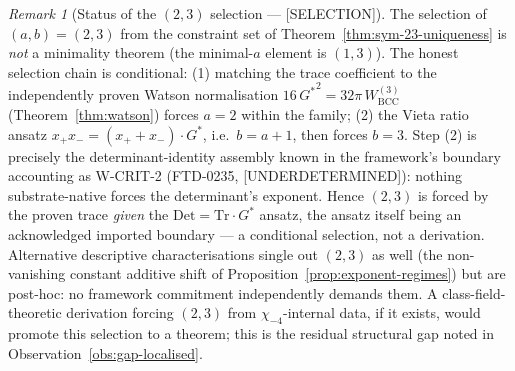 \documentclass[11pt]{article}
\theoremstyle{definition}
\theoremstyle{remark}
\newtheorem*{remark}{Remark}
\newcommand{\Gs}{G^{*}}
\newcommand{\Gss}{{G^{*}}^{2}}
\begin{document}
\begin{remark}[Status of the $(2, 3)$ selection --- \textup{[SELECTION]}]\label{rem:sym-23-selection-status}
The selection of $(a, b) = (2, 3)$ from the constraint set of
Theorem~\ref{thm:sym-23-uniqueness} is \emph{not} a minimality theorem
(the minimal-$a$ element is $(1, 3)$). The honest selection chain is
conditional:
(1) matching the trace coefficient to the independently proven Watson
normalisation $16\,\Gss = 32\pi\,W^{(3)}_{\mathrm{BCC}}$
(Theorem~\ref{thm:watson}) forces $a = 2$ within the family;
(2) the Vieta ratio ansatz $x_+ x_- = (x_+ + x_-)\cdot\Gs$, i.e.\
$b = a + 1$, then forces $b = 3$. Step (2) is precisely the
determinant-identity assembly known in the framework's boundary
accounting as W-CRIT-2 (FTD-0235, \textup{[UNDERDETERMINED]}): nothing
substrate-native forces the determinant's exponent. Hence $(2, 3)$ is
forced by the proven trace \emph{given} the
$\mathrm{Det} = \mathrm{Tr}\cdot\Gs$ ansatz, the ansatz itself being an
acknowledged imported boundary --- a conditional selection, not a
derivation. Alternative descriptive characterisations single out
$(2, 3)$ as well (the non-vanishing constant additive shift of
Proposition~\ref{prop:exponent-regimes}) but are post-hoc: no framework
commitment independently demands them. A class-field-theoretic
derivation forcing $(2, 3)$ from $\chi_{-4}$-internal data, if it
exists, would promote this selection to a theorem; this is the
residual structural gap noted in Observation~\ref{obs:gap-localised}.
\end{remark}
\end{document}
